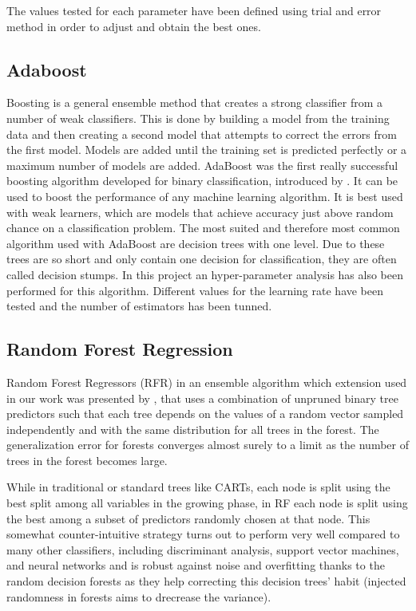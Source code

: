 \documentclass[anon]{CI}
\begin{document}
The values tested for each parameter have been defined using trial and error method in order to adjust and obtain the best ones.

\subsection{Adaboost}

Boosting is a general ensemble method that creates a strong classifier from a number of weak classifiers. This is done by building a model from the training data and then creating a second model that attempts to correct the errors from the first model. Models are added until the training set is predicted perfectly or a maximum number of models are added.
AdaBoost was the first really successful boosting algorithm developed for binary classification, introduced by \cite{10.1006/jcss.1997.1504}. It can be used to boost the performance of any machine learning algorithm. It is best used with weak learners, which are models that achieve accuracy just above random chance on a classification problem.
The most suited and therefore most common algorithm used with AdaBoost are decision trees with one level. Due to these trees are so short and only contain one decision for classification, they are often called decision stumps.
In this project an hyper-parameter analysis has also been performed for this algorithm. Different values for the learning rate have been tested and the number of estimators has been tunned.

\subsection{Random Forest Regression}

Random Forest Regressors (RFR) in an ensemble algorithm which extension used in our work was presented by \cite{10.1023/A:1010933404324}, that uses a combination of unpruned binary tree predictors such that each tree depends on the values of a random vector sampled independently and with the same distribution for all trees in the forest. The generalization error for forests converges almost surely to a limit as the number of trees in the forest becomes large. 

While in traditional or standard trees like CARTs, each node is split using the best split among all variables in the growing phase, in RF each node is split using the best among a subset of predictors randomly chosen at that node. This somewhat counter-intuitive strategy turns out to perform very well compared to many other classifiers, including discriminant analysis, support vector machines, and neural networks and is robust against noise and overfitting thanks to the random decision forests as they help correcting this decision trees' habit (injected randomness in forests aims to drecrease the variance). 
\end{document}
